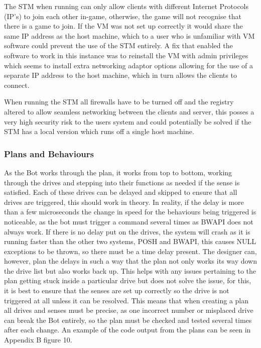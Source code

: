 \documentclass[journal]{IEEEtran}
\begin{document}
	The STM when running can only allow clients with different Internet Protocols (IP's) to join each other in-game, otherwise, the game will not recognise that there is a game to join. If the VM was not set up correctly it would share the same IP address as the host machine, which to a user who is unfamiliar with VM software could prevent the use of the STM entirely. A fix that enabled the software to work in this instance was to reinstall the VM with admin privileges which seems to install extra networking adaptor options allowing for the use of a separate IP address to the host machine, which in turn allows the clients to connect.
	
	When running the STM all firewalls have to be turned off and the registry altered to allow seamless networking between the clients and server, this posses a very high security risk to the users system and could potentially be solved if the STM has a local version which runs off a single host machine.
	\newline
	\subsubsection{Plans and Behaviours}
	As the Bot works through the plan, it works from top to bottom, working through the drives and stepping into their functions as needed if the sense is satisfied. Each of these drives can be delayed and skipped to ensure that all drives are triggered, this should work in theory. In reality, if the delay is more than a few microseconds the change in speed for the behaviours being triggered is noticeable, as the bot must trigger a command several times as BWAPI does not always work. If there is no delay put on the drives, the system will crash as it is running faster than the other two systems, POSH and BWAPI, this causes NULL exceptions to be thrown, so there must be a time delay present. The designer can, however, plan the delays in such a way that the plan not only works its way down the drive list but also works back up. This helps with any issues pertaining to the plan getting stuck inside a particular drive but does not solve the issue, for this, it is best to ensure that the senses are set up correctly so the drive is not triggered at all unless it can be resolved. This means that when creating a plan all drives and senses must be precise, as one incorrect number or misplaced drive can break the Bot entirely, so the plan must be checked and tested several times after each change. An example of the code output from the plans can be seen in Appendix B figure 10.
	
\end{document}
